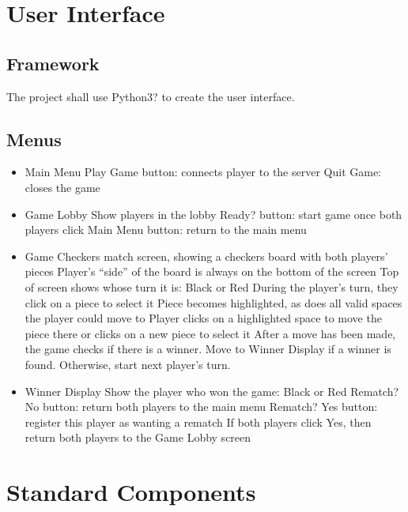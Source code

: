 \documentclass[10pt]{article}
\begin{document}
\section{User Interface}

\subsection{Framework}

The project shall use Python3? to create the user interface.

\subsection{Menus}

\begin{itemize}
\item Main Menu
    \subitem Play Game button: connects player to the server
    \subitem Quit Game: closes the game

\item Game Lobby
    \subitem Show players in the lobby
    \subitem Ready? button: start game once both players click
    \subitem Main Menu button: return to the main menu

\item Game
    \subitem Checkers match screen, showing a checkers board with both players’ pieces
        \subsubitem Player’s “side” of the board is always on the bottom of the screen
    \subitem Top of screen shows whose turn it is: Black or Red
        \subsubitem During the player’s turn, they click on a piece to select it
        \subsubitem Piece becomes highlighted, as does all valid spaces the player could move to
        \subsubitem Player clicks on a highlighted space to move the piece there or clicks on a new piece to select it
        \subsubitem After a move has been made, the game checks if there is a winner. Move to Winner Display if a winner is found. Otherwise, start next player’s turn.

\item Winner Display
    \subitem Show the player who won the game: Black or Red
    \subitem Rematch? No button: return both players to the main menu
    \subitem Rematch? Yes button: register this player as wanting a rematch
        \subsubitem If both players click Yes, then return both players to the Game Lobby screen
\end{itemize}

\section{Standard Components}
\end{document}
